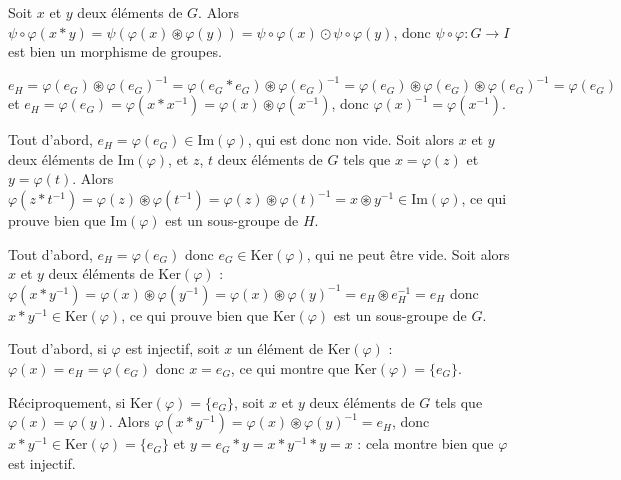 \begin{sol}
Soit $x$ et $y$ deux éléments de $G$.
Alors $\psi \circ \varphi(x \ast y) = \psi(\varphi(x) \circledast \varphi(y)) =
\psi\circ\varphi(x) \odot \psi\circ\varphi(y)$,
donc $\psi\circ\varphi : G \to I$ est bien un morphisme de groupes.
\end{sol}

\begin{sol}
$e_H = \varphi(e_G) \circledast \varphi(e_G)^{-1} = \varphi(e_G \ast e_G) \circledast \varphi(e_G)^{-1} =
\varphi(e_G) \circledast \varphi(e_G) \circledast \varphi(e_G)^{-1} = \varphi(e_G)$ et
$e_H = \varphi(e_G) = \varphi(x \ast x^{-1}) = \varphi(x) \circledast \varphi(x^{-1})$, donc
$\varphi(x)^{-1} = \varphi(x^{-1})$.
\end{sol}

\begin{sol}
Tout d'abord, $e_H = \varphi(e_G) \in \mathrm{Im}(\varphi)$, qui est donc non vide.
Soit alors $x$ et $y$ deux éléments de $\mathrm{Im}(\varphi)$,
et $z$, $t$ deux éléments de $G$ tels que $x = \varphi(z)$ et $y = \varphi(t)$.
Alors $\varphi(z \ast t^{-1}) = \varphi(z) \circledast \varphi(t^{-1}) =
\varphi(z) \circledast \varphi(t)^{-1} = x \circledast y^{-1} \in \mathrm{Im}(\varphi)$,
ce qui prouve bien que $\mathrm{Im}(\varphi)$ est un sous-groupe de $H$.
\end{sol}

\begin{sol}
Tout d'abord, $e_H = \varphi(e_G)$ donc $e_G \in \mathrm{Ker}(\varphi)$, qui ne peut être vide.
Soit alors $x$ et $y$ deux éléments de $\mathrm{Ker}(\varphi)$ :
$\varphi(x \ast y^{-1}) = \varphi(x) \circledast \varphi(y^{-1}) =
\varphi(x) \circledast \varphi(y)^{-1} = e_H \circledast e_H^{-1} = e_H$ donc
$x \ast y^{-1} \in \mathrm{Ker}(\varphi)$,
ce qui prouve bien que $\mathrm{Ker}(\varphi)$ est un sous-groupe de $G$.
\end{sol}

\begin{sol}
Tout d'abord, si $\varphi$ est injectif, soit $x$ un élément de $\mathrm{Ker}(\varphi)$ :
$\varphi(x) = e_H = \varphi(e_G)$ donc $x = e_G$, ce qui montre que $\mathrm{Ker}(\varphi) = \{e_G\}$.

Réciproquement, si $\mathrm{Ker}(\varphi) = \{e_G\}$, soit $x$ et $y$ deux éléments de $G$ tels que
$\varphi(x) = \varphi(y)$. Alors
$\varphi(x \ast y^{-1}) = \varphi(x) \circledast \varphi(y)^{-1} = e_H$, donc
$x \ast y^{-1} \in \mathrm{Ker}(\varphi) = \{e_G\}$ et
$y = e_G \ast y = x \ast y^{-1} \ast y = x$ : cela montre bien que $\varphi$ est injectif.
\end{sol}

